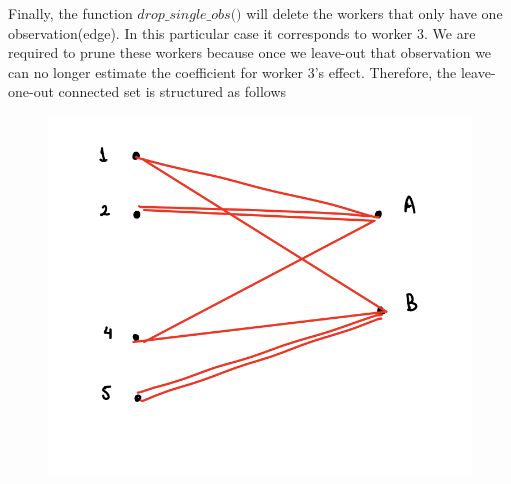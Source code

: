 \documentclass[12pt]{article}
\begin{document}
Finally, the function $\textit{drop\_single\_obs()}$ will delete the workers that only have one observation(edge). In this particular case it corresponds to worker 3. We are required to prune these workers because once we leave-out that observation we can no longer estimate the coefficient for worker 3's effect. Therefore, the leave-one-out connected set is structured as follows

\begin{figure}[h!]
    \centering
\includegraphics[scale=0.6]{leaveoutnetwork.png}    
\end{figure}
\end{document}
